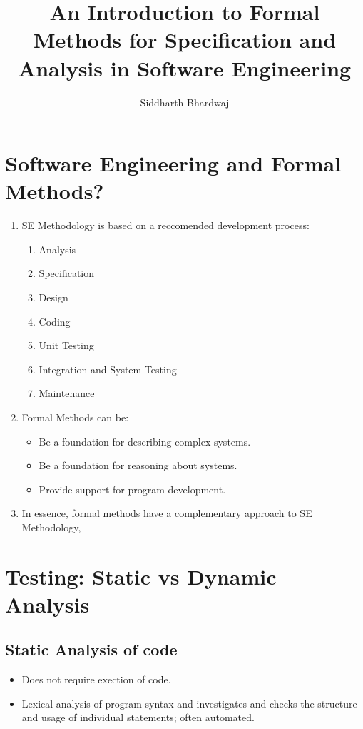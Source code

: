 \documentclass{article}
\title{An Introduction to Formal Methods for Specification and Analysis in Software Engineering}
\author{Siddharth Bhardwaj}
\begin{document}
    \maketitle
    \newpage

    \section{Software Engineering and Formal Methods?}
    \begin{enumerate}
        \item SE Methodology is based on a reccomended development process:\begin{enumerate}
            \item Analysis
            \item Specification
            \item Design
            \item Coding
            \item Unit Testing 
            \item Integration and System Testing 
            \item Maintenance
        \end{enumerate}    
        \item Formal Methods can be:\begin{itemize}
            \item Be a foundation for describing complex systems.
            \item Be a foundation for reasoning about systems.
            \item Provide support for program development.
        \end{itemize}
        \item In essence, formal methods have a complementary approach to SE Methodology,
    \end{enumerate}
    \section{Testing: Static vs Dynamic Analysis}
    \subsection{Static Analysis of code}
    \begin{itemize}
        \item Does not require exection of code.
        \item Lexical analysis of program syntax and investigates and checks the structure and usage
        of individual statements; often automated. 
    \end{itemize}
\end{document}
